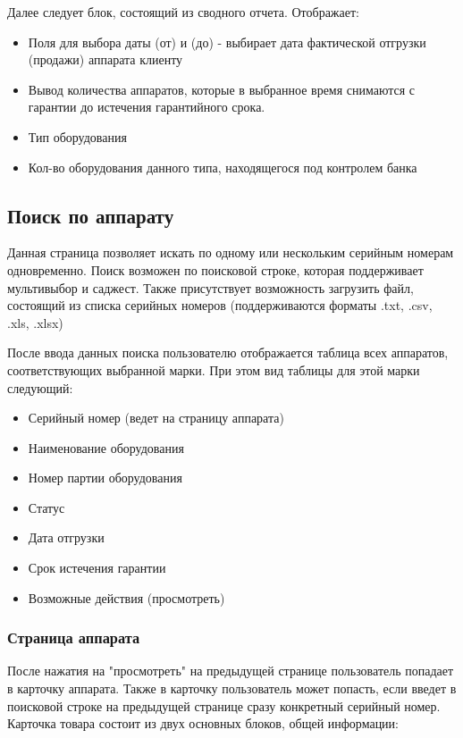 \documentclass[DIV=calc, paper=a4, fontsize=11pt]{scrartcl} %
\newcommand{\AcceptedFormats}{.txt, .csv, .xls, .xlsx}
\begin{document}
Далее следует блок, состоящий из сводного отчета. Отображает:


\begin{itemize}
	\item Поля для выбора даты (от) и (до) - выбирает дата фактической отгрузки (продажи) аппарата клиенту
	\item Вывод количества аппаратов, которые в выбранное время снимаются с гарантии до истечения гарантийного срока.
	\item Тип оборудования
	\item Кол-во оборудования данного типа, находящегося под контролем банка
\end{itemize}

\subsection{Поиск по аппарату}
Данная страница позволяет искать по одному или нескольким серийным номерам одновременно. Поиск возможен по поисковой строке, которая поддерживает мультивыбор и саджест. Также присутствует возможность загрузить файл, состоящий из списка серийных номеров (поддерживаются форматы \AcceptedFormats)

После ввода данных поиска пользователю отображается таблица всех аппаратов, соответствующих выбранной марки. При этом вид таблицы для этой марки следующий:

\begin{itemize}
	\item Серийный номер (ведет на страницу аппарата)
	\item Наименование оборудования
	\item Номер партии оборудования
	\item Статус
	\item Дата отгрузки
	\item Срок истечения гарантии
	\item Возможные действия (просмотреть)
\end{itemize}

\subsubsection{Страница аппарата}
После нажатия на "просмотреть" на предыдущей странице пользователь попадает в карточку аппарата. Также в карточку пользователь может попасть, если введет в поисковой строке на предыдущей странице сразу конкретный серийный номер.
\\[0.5cm]
Карточка товара состоит из двух основных блоков, общей информации:
\end{document}

